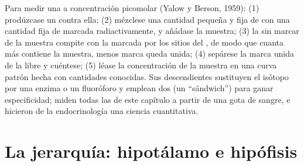 \begin{method}[Radioinmunoanálisis]\label{met:b3:endocrinology:ria}
Para medir una  a concentración picomolar (Yalow y Berson,
1959): (1) prodúzcase un  contra ella; (2) mézclese una
cantidad pequeña y fija de  con una cantidad fija de 
marcada radiactivamente, y añádase la muestra; (3) la  sin
marcar de la muestra compite con la marcada por los sitios del
, de modo que cuanta más  contiene la muestra, menos
marca queda unida; (4) sepárese la marca unida de la libre y cuéntese;
(5) léase la concentración de la muestra en una curva patrón hecha con
cantidades conocidas. Sus descendientes sustituyen el isótopo por una
enzima o un fluoróforo y emplean dos  (un ``sándwich'') para
ganar especificidad; miden todas las  de este capítulo a partir
de una gota de sangre, e hicieron de la endocrinología una ciencia
cuantitativa.
\end{method}

\section{La jerarquía: hipotálamo e hipófisis}

